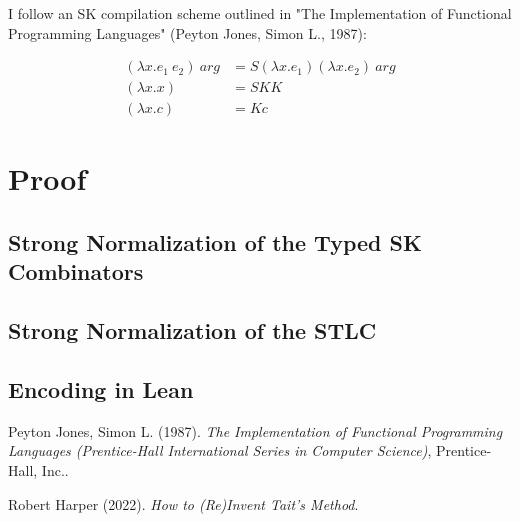 \documentclass[11pt]{article}
\begin{document}
I follow an SK compilation scheme outlined in "The Implementation of Functional Programming Languages" (Peyton Jones, Simon L., 1987):

\begin{align}
(\lambda x.e_{1}\ e_{2})\ arg &= S (\lambda x.e_{1}) (\lambda x.e_{2})\ arg \\
(\lambda x.x) &= SKK \\
(\lambda x.c) &= K c
\end{align}
\section{Proof}
\label{sec:orgb1961a0}
\subsection{Strong Normalization of the Typed SK Combinators}
\label{sec:org12d23e8}
\subsection{Strong Normalization of the STLC}
\label{sec:org16c7d50}
\subsection{Encoding in Lean}
\label{sec:orgc484a71}

\noindent
Peyton Jones, Simon L. (1987). \emph{The Implementation of Functional Programming Languages (Prentice-Hall International Series in Computer Science)}, Prentice-Hall, Inc..

\noindent
Robert Harper (2022). \emph{How to (Re)Invent Tait’s Method}.
\end{document}
